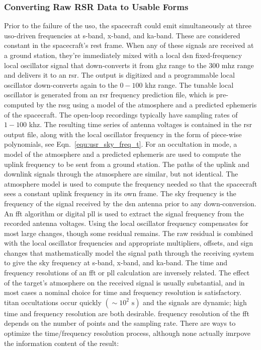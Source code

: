 \documentclass{article}
\begin{document}
            \subsubsection{\footnotesize Converting Raw RSR Data to Usable Forms}
            Prior to the failure of the \gls{uso}, the spacecraft could emit simultaneously at three \gls{uso}-driven frequencies at \gls{s-band}, \gls{x-band}, and \gls{ka-band}. These are considered constant in the spacecraft's rest frame. When any of these signals are received at a ground station, they're immediately mixed with a local \gls{dsn} fixed-frequency local oscillator signal that down-converts it from \gls{ghz} range to the $300$ \gls{mhz} range and delivers it to an \gls{rsr}. The output is digitized and a programmable local oscillator down-converts again to the $0-100$ \gls{khz} range. The tunable local oscillator is generated from an \gls{rsr} \gls{frequency} prediction file, which is pre-computed by the \gls{rssg} using a model of the \gls{atmosphere} and a predicted \gls{ephemeris} of the spacecraft. The \gls{open-loop} recordings typically have sampling rates of $1-100$ \gls{khz}. The resulting time series of antenna voltages is contained in the \gls{rsr} output file, along with the local oscillator frequency in the form of piece-wise polynomials, see Eqn.~\ref{equ:usr_sky_freq_t}. For an \gls{occultation} in  mode, a model of the \gls{atmosphere} and a predicted \gls{ephemeris} are used to compute the \gls{uplink} \gls{frequency} to be sent from a ground station. The paths of the \gls{uplink} and \gls{downlink} signals through the \gls{atmosphere} are similar, but not identical. The \gls{atmosphere} model is used to compute the \gls{frequency} needed so that the spacecraft sees a constant \gls{uplink} \gls{frequency} in its own frame. The \gls{sky frequency} is the frequency of the signal received by the \gls{dsn} antenna prior to any down-conversion. An \gls{fft} algorithm or digital \gls{pll} is used to extract the signal frequency from the recorded antenna voltages. Using the local oscillator \gls{frequency} compensates for most large changes, though some residual remains. The raw residual is combined with the local oscillator frequencies and appropriate multipliers, offsets, and sign changes that mathematically model the signal path through the receiving system to give the \gls{sky frequency} at \gls{s-band}, \gls{x-band}, and \gls{ka-band}. The time and frequency resolutions of an \gls{fft} or \gls{pll} calculation are inversely related. The effect of the target's atmosphere on the received signal is usually substantial, and in most cases a nominal choice for time and frequency resolution is satisfactory. \gls{titan} \glspl{occultation} occur quickly $(\sim 10^{2}\textrm{ s})$ and the signals are dynamic; high time and \gls{frequency} \gls{resolution} are both desirable. \Gls{frequency} \gls{resolution} of the \gls{fft} depends on the number of points and the \gls{sampling rate}. There are ways to optimize the time/frequency resolution process, although none actually imrpove the information content of the result:
\end{document}
